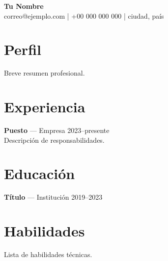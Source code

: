 \documentclass[11pt,a4paper]{article}
\begin{document}
\begin{center}
  {\LARGE \textbf{Tu Nombre}}\\
  correo@ejemplo.com \quad | \quad +00 000 000 000 \quad | \quad ciudad, país
\end{center}

\section*{Perfil}
Breve resumen profesional.

\section*{Experiencia}
\textbf{Puesto} — Empresa \hfill 2023--presente\\
Descripción de responsabilidades.

\section*{Educación}
\textbf{Título} — Institución \hfill 2019--2023

\section*{Habilidades}
Lista de habilidades técnicas.
\end{document}

